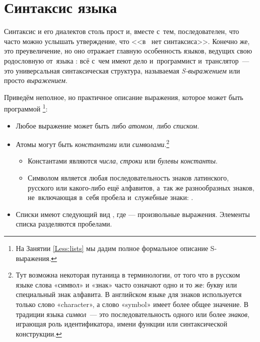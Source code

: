 
\label{Les:Scheme-programming}

\section{Синтаксис языка \Scheme}%
\label{Sec:expressions}%
%
Синтаксис  и его диалектов столь прост и, вместе с~тем, последователен, что часто можно услышать утверждение, что <<в~ нет синтаксиса>>. Конечно же, это преувеличение, но оно отражает главную особенность языков, ведущих свою родословную от~языка \Lisp: всё с~чем имеют дело и~программист и~транслятор~--- это универсальная синтаксическая структура, называемая \emph{S-выражением} или просто \emph{выражением}.{\par}

Приведём неполное, но практичное описание выражения, которое может быть программой \Scheme\footnote{На Занятии \ref{Less:lists} мы дадим полное формальное описание S-выражения.}:

\begin{itemize}[--]
 \item Любое выражение может быть либо \emph{атомом}, либо \emph{списком}. 
 \item {}Атомы могут быть \emph{константами} или \emph{символами}.\footnote{Тут возможна некоторая путаница в терминологии, от того что в русском языке слова «символ» и «знак» часто означают одно и то же: букву или специальный знак алфавита. В английском языке для знаков используется только слово «character», а слово «symbol» имеет более общее значение. В традиции языка \Lisp \emph{символ}~--- это последовательность одного или более \emph{знаков}, играющая роль идентификатора, имени функции или синтаксической конструкции.} 
\begin{itemize}[--]
 \item Константами являются \emph{числа}, \emph{строки} или \emph{булевы} \emph{константы}.
 \item\label{symbol}Символом является любая последовательность знаков латинского, русского или какого-либо ещё алфавитов, а~так же разнообразных знаков, не~включающая в~себя пробела и~служебные знаки: . 
\end{itemize}
 \item Списки имеют следующий вид , где  --- произвольные выражения. Элементы списка разделяются пробелами.
\end{itemize}

